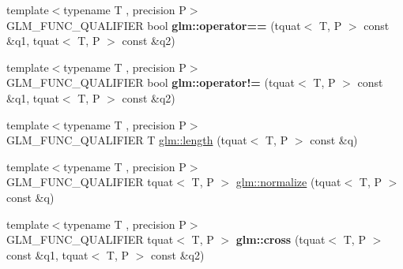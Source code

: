 \begin{DoxyCompactItemize}
\item 
\hypertarget{namespaceglm_aea4f3403a948c727fde4945f719913ea}{{\footnotesize template$<$typename T , precision P$>$ }\\G\-L\-M\-\_\-\-F\-U\-N\-C\-\_\-\-Q\-U\-A\-L\-I\-F\-I\-E\-R bool {\bfseries glm\-::operator==} (tquat$<$ T, P $>$ const \&q1, tquat$<$ T, P $>$ const \&q2)}\label{namespaceglm_aea4f3403a948c727fde4945f719913ea}

\item 
\hypertarget{namespaceglm_a5390634e3339760a2c04f6b1fabefd2e}{{\footnotesize template$<$typename T , precision P$>$ }\\G\-L\-M\-\_\-\-F\-U\-N\-C\-\_\-\-Q\-U\-A\-L\-I\-F\-I\-E\-R bool {\bfseries glm\-::operator!=} (tquat$<$ T, P $>$ const \&q1, tquat$<$ T, P $>$ const \&q2)}\label{namespaceglm_a5390634e3339760a2c04f6b1fabefd2e}

\item 
{\footnotesize template$<$typename T , precision P$>$ }\\G\-L\-M\-\_\-\-F\-U\-N\-C\-\_\-\-Q\-U\-A\-L\-I\-F\-I\-E\-R T \hyperlink{group__gtc__quaternion_gac682181783027544c8d251b4d3a60cf8}{glm\-::length} (tquat$<$ T, P $>$ const \&q)
\item 
{\footnotesize template$<$typename T , precision P$>$ }\\G\-L\-M\-\_\-\-F\-U\-N\-C\-\_\-\-Q\-U\-A\-L\-I\-F\-I\-E\-R tquat$<$ T, P $>$ \hyperlink{group__gtc__quaternion_ga35b6bcb22ac6d1e4a85440f5b69bdf86}{glm\-::normalize} (tquat$<$ T, P $>$ const \&q)
\item 
\hypertarget{namespaceglm_ae21800a9767f21b7649c196485d924b4}{{\footnotesize template$<$typename T , precision P$>$ }\\G\-L\-M\-\_\-\-F\-U\-N\-C\-\_\-\-Q\-U\-A\-L\-I\-F\-I\-E\-R tquat$<$ T, P $>$ {\bfseries glm\-::cross} (tquat$<$ T, P $>$ const \&q1, tquat$<$ T, P $>$ const \&q2)}\label{namespaceglm_ae21800a9767f21b7649c196485d924b4}


\end{DoxyCompactItemize}
